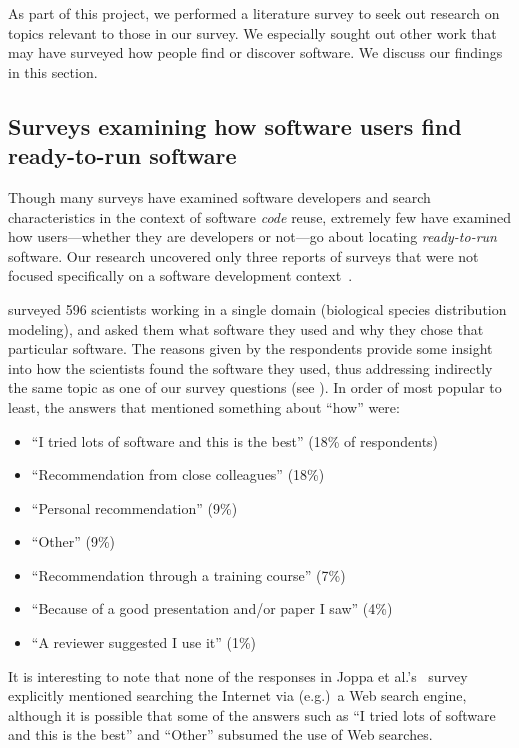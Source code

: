 \documentclass{casicswhitepaper}
\begin{document}
As part of this project, we performed a literature survey to seek out research on topics relevant to those in our survey.  We especially sought out other work that may have surveyed how people find or discover software.  We discuss our findings in this section.


\subsection{Surveys examining how software users find ready-to-run software}

Though many surveys have examined software developers and search characteristics in the context of software \emph{code} reuse, extremely few have examined how users---whether they are developers or not---go about locating \emph{ready-to-run} software.  Our research uncovered only three reports of surveys that were not focused specifically on a software development context~\cite{joppa2013troubling, huang2013provenance, lawrence2015science}.

\citet{joppa2013troubling} surveyed 596 scientists working in a single domain (biological species distribution modeling), and asked them what software they used and why they chose that particular software.  The reasons given by the respondents provide some insight into how the scientists found the software they used, thus addressing indirectly the same topic as one of our survey questions (see ).  In order of most popular to least, the answers that mentioned something about ``how'' were:

\begin{itemize}[itemsep=-0.5ex]

\item ``I tried lots of software and this is the best'' (18\% of respondents)
\item ``Recommendation from close colleagues'' (18\%)
\item ``Personal recommendation'' (9\%)
\item ``Other'' (9\%)
\item ``Recommendation through a training course'' (7\%)
\item ``Because of a good presentation and/or paper I saw'' (4\%)
\item ``A reviewer suggested I use it'' (1\%)

\end{itemize}

It is interesting to note that none of the responses in Joppa et al.'s~\cite{joppa2013troubling} survey explicitly mentioned searching the Internet via (e.g.)\ a Web search engine, although it is possible that some of the answers such as ``I tried lots of software and this is the best'' and ``Other'' subsumed the use of Web searches.
\end{document}
